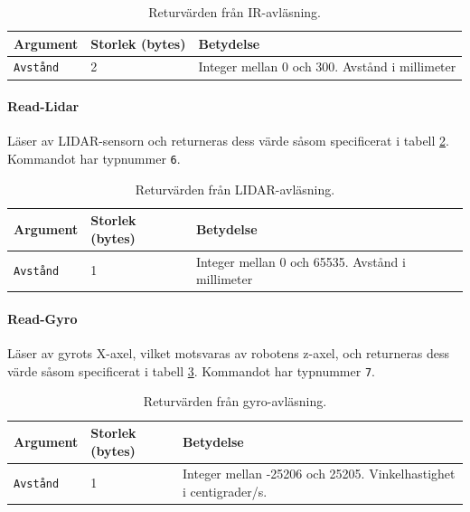 \documentclass[a4paper,11pt]{article}
\begin{document}
\begin{table}[h!]
    \centering
    \begin{tabular}{|l|l|l|}
    \rowcolor{gray!50}
    	\hline
    	\textbf{Argument} & \textbf{Storlek (bytes)} & \textbf{Betydelse} \\ \hline
    	\texttt{Avstånd} & 2 & Integer mellan 0 och 300. Avstånd i millimeter \\ \hline
    \end{tabular}
    \caption{Returvärden från IR-avläsning.}
    \label{tab:ir}
\end{table}

\paragraph{Read-Lidar}
Läser av LIDAR-sensorn och returneras dess värde såsom specificerat i tabell \ref{tab:lidar}. Kommandot har typnummer \texttt{6}.
\begin{table}[h!]
    \centering
    \begin{tabular}{|l|l|l|}
    \rowcolor{gray!50}
        \hline
        \textbf{Argument} & \textbf{Storlek (bytes)} & \textbf{Betydelse} \\ \hline
        \texttt{Avstånd} & 1 & Integer mellan 0 och 65535. Avstånd i millimeter \\ \hline
        \end{tabular}
    \caption{Returvärden från LIDAR-avläsning.}
    \label{tab:lidar}
\end{table}


\paragraph{Read-Gyro}
Läser av gyrots X-axel, vilket motsvaras av robotens z-axel, och returneras dess värde såsom specificerat i tabell \ref{tab:gyro}. Kommandot har typnummer \texttt{7}.
\begin{table}[h!]
    \centering
    \begin{tabular}{|l|l|l|}
    \rowcolor{gray!50}
        \hline
        \textbf{Argument} & \textbf{Storlek (bytes)} & \textbf{Betydelse} \\ \hline
        \texttt{Avstånd} & 1 & Integer mellan -25206 och 25205. Vinkelhastighet i centigrader/s. \\ \hline
    \end{tabular}
    \caption{Returvärden från gyro-avläsning.}
    \label{tab:gyro}
\end{table}
\end{document}
